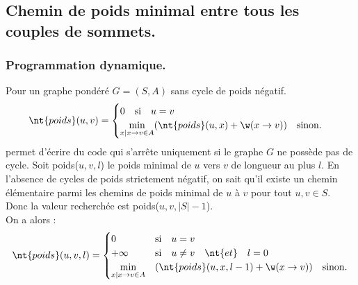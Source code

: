 \documentclass[french, 11pt]{article}
\begin{document}
\subsection{Chemin de poids minimal entre tous les couples de sommets.}

\subsubsection{Programmation dynamique.}

\begin{defi}{}{}
    Pour un graphe pondéré $G=(S,A)$ sans cycle de poids négatif. 
    \begin{equation*}
        \nt{poids}(u,v)=\begin{cases}
            0 \quad \text{si} \quad u=v\\
            \min\limits_{x\mid x\to v \in A}(\nt{poids}(u,x)+\w(x\to v)) \quad \text{sinon}.
        \end{cases}
    \end{equation*}
    permet d'écrire du code qui s'arrête uniquement si le graphe $G$ ne possède pas de cycle.\n
    Soit poids($u,v,l$) le poids minimal de $u$ vers $v$ de longueur au plus $l$. En l'absence de cycles de poids strictement négatif, on sait qu'il existe un chemin élémentaire parmi les chemins de poids minimal de $u$ à $v$ pour tout $u,v\in S$.\\
    Donc la valeur recherchée est poids($u,v,|S|-1$).\\
    On a alors :
    \begin{equation*}
        \nt{poids}(u,v,l)=\begin{cases}
            0 \quad &\text{si} \quad u=v\\
            +\infty \quad &\text{si} \quad u\neq v \quad \nt{et} \quad l=0\\
            \min\limits_{x\mid x\to v \in A}&(\nt{poids}(u,x,l-1)+\w(x\to v)) \quad \text{sinon}.
        \end{cases}
    \end{equation*}
\end{defi}
\end{document}
